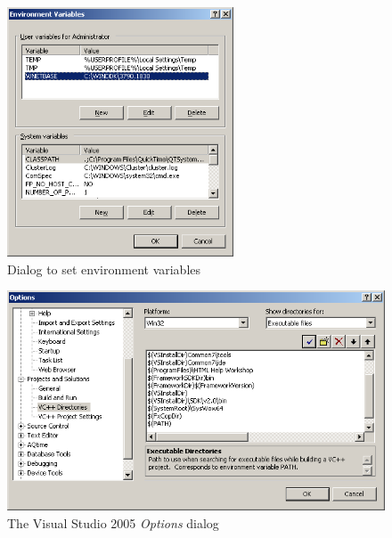 \documentclass[a4paper,titlepage]{report}
\begin{document}
\begin{figure}[h]
    \centering
    \caption{Dialog to set environment variables\label{fig:EnvironmentVariables}}
    \includegraphics[width=0.6\textwidth]{./EnvironmentVars.png}
\end{figure}

\begin{figure}[h]
    \centering
    \caption{The Visual Studio 2005 \emph{Options} dialog\label{fig:VisualStudioOptionsDialog}}
    \includegraphics[width=\textwidth]{./VS2005_ExeDirs.png}
\end{figure}

\pagebreak{}\tableofcontents\thispagestyle{fancy}
\end{document}
